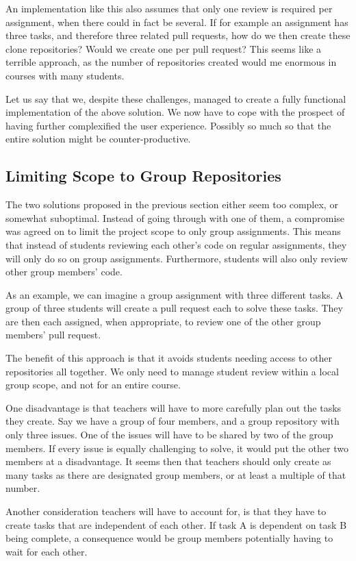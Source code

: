 An implementation like this also assumes that only one review is required per assignment, when there could in fact be several.
If for example an assignment has three tasks, and therefore three related pull requests, how do we then create these clone repositories?
Would we create one per pull request?
This seems like a terrible approach, as the number of repositories created would me enormous in courses with many students.

Let us say that we, despite these challenges, managed to create a fully functional implementation of the above solution.
We now have to cope with the prospect of having further complexified the user experience.
Possibly so much so that the entire solution might be counter-productive.

\subsection{Limiting Scope to Group Repositories}

The two solutions proposed in the previous section either seem too complex, or somewhat suboptimal.
Instead of going through with one of them, a compromise was agreed on to limit the project scope to only group assignments.
This means that instead of students reviewing each other's code on regular assignments, they will only do so on group assignments.
Furthermore, students will also only review other group members' code.

As an example, we can imagine a group assignment with three different tasks.
A group of three students will create a pull request each to solve these tasks.
They are then each assigned, when appropriate, to review one of the other group members' pull request.

The benefit of this approach is that it avoids students needing access to other repositories all together.
We only need to manage student review within a local group scope, and not for an entire course.

One disadvantage is that teachers will have to more carefully plan out the tasks they create.
Say we have a group of four members, and a group repository with only three issues.
One of the issues will have to be shared by two of the group members.
If every issue is equally challenging to solve, it would put the other two members at a disadvantage.
It seems then that teachers should only create as many tasks as there are designated group members, or at least a multiple of that number.

Another consideration teachers will have to account for, is that they have to create tasks that are independent of each other.
If task A is dependent on task B being complete, a consequence would be group members potentially having to wait for each other.

